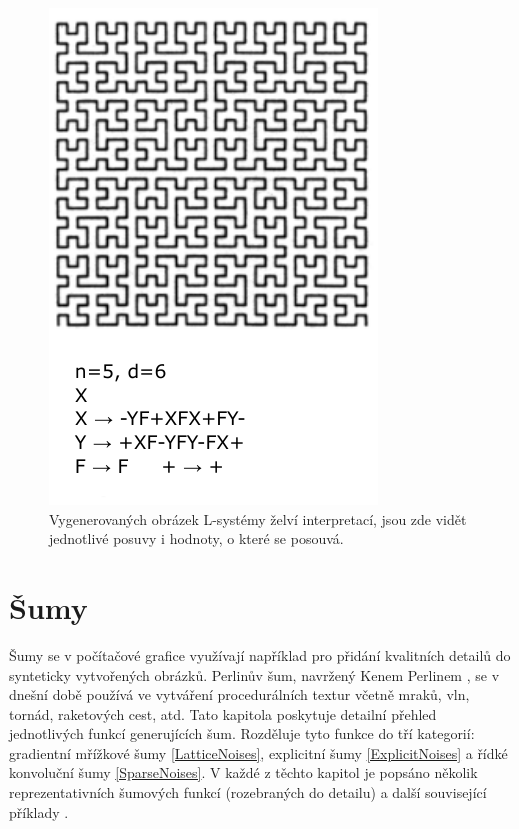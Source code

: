 \begin{figure}[H]
	\centering
	\includegraphics[scale=1]{obrazky-figures/L-system.pdf}
	\caption[L-system]{Vygenerovaných obrázek L-systémy želví interpretací, jsou zde vidět jednotlivé posuvy i hodnoty, o které se posouvá.}
\end{figure}
\newpage

\section{Šumy}
\label{noise}
Šumy se v počítačové grafice využívají například pro přidání kvalitních detailů do synteticky vytvořených obrázků. Perlinův šum, navržený Kenem Perlinem \cite{PerlinKen}, se v dnešní době používá ve vytváření procedurálních textur včetně mraků, vln, tornád, raketových cest, atd. Tato kapitola poskytuje detailní přehled jednotlivých funkcí generujících šum. Rozděluje tyto funkce do tří kategorií: gradientní mřížkové šumy \ref{LatticeNoises}, explicitní šumy \ref{ExplicitNoises} a řídké konvoluční šumy \ref{SparseNoises}. V každé z těchto kapitol je popsáno několik reprezentativních šumových funkcí (rozebraných do detailu) a další související příklady \cite{Lagae10}. 

